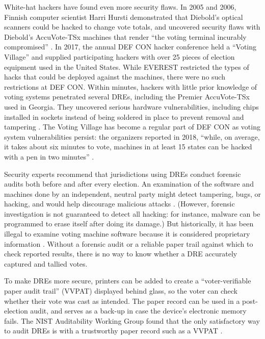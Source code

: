 \documentclass[runningheads]{llncs}
\begin{document}
White-hat hackers have found even more security flaws.
In 2005 and 2006, Finnish computer scientist Harri Hursti demonstrated that 
Diebold's optical scanners could be hacked to change vote totals,
and uncovered security flaws with Diebold's AccuVote-TSx machines that render
``the voting terminal incurably compromised'' \cite{hursti_critical_2005,hursti_critical_2006}.
In 2017, the annual DEF CON hacker conference held a ``Voting Village''
and supplied participating hackers with over 25 pieces of election equipment used in the United States.
While EVEREST restricted the types of hacks that could be deployed against the machines,
there were no such restrictions at DEF CON. 
Within minutes, hackers with little prior knowledge of voting systems penetrated several DREs,
including the Premier AccuVote-TSx used in Georgia.
They uncovered serious hardware vulnerabilities, including chips installed in sockets
instead of being soldered in place to prevent removal and tampering \cite{blaze17}.
The Voting Village has become a regular part of DEF CON as voting system vulnerabilities persist:
the organizers reported in 2018, ``while, on average, it takes about six minutes to vote, machines in at least 15 states can be hacked with a pen in two minutes'' \cite{blaze18}.

Security experts recommend that jurisdictions using DREs conduct forensic audits both before and after 
every election.
An examination of the software and machines done by an independent, neutral party might detect tampering, bugs, or hacking,
and would help discourage malicious attacks \cite{curling_kemp_amicus_2018}. %
(However, forensic investigation is not guaranteed to detect all hacking: for instance,
malware can be programmed to erase itself after doing its damage.)
But historically, it has been illegal to examine voting machine software because it is considered proprietary information \cite{peha_touch-and-go_2006}.
Without a forensic audit or a reliable paper trail against which 
to check reported results, there is no way to know whether a DRE accurately captured and tallied votes.

To make DREs more secure, printers can be added to create a ``voter-verifiable paper audit trail'' (VVPAT)
displayed behind glass,
so the voter can check whether their vote was cast as intended.
The paper record can be used in a post-election audit,
and serves as a back-up in case the device's electronic memory fails.
The NIST Auditability Working Group found that the only satisfactory way to audit DREs is with a trustworthy paper record such as a VVPAT \cite{nist_auditability_2015}.
\end{document}
